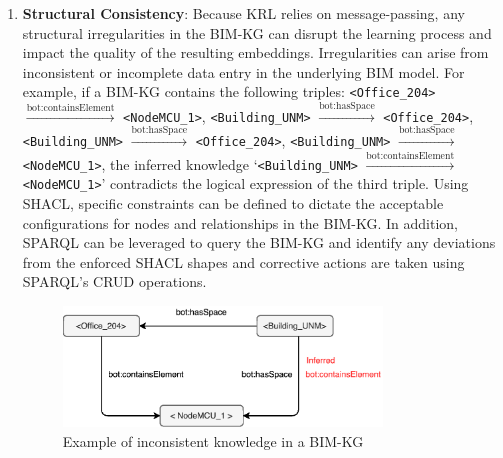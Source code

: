 \begin{enumerate}
    \item 
    \textbf{Structural Consistency}: Because \ac{KRL} relies on message-passing, any structural irregularities in the \ac{BIM-KG} can disrupt the learning process and impact the quality of the resulting embeddings. Irregularities can arise from inconsistent or incomplete data entry in the underlying \ac{BIM} model. For example, if a \ac{BIM-KG} contains the following triples: 
    \texttt{<Office\_204>} $\xrightarrow{\text{bot:containsElement}}$ \texttt{<NodeMCU\_1>}, \texttt{<Building\_UNM>} $\xrightarrow{\text{bot:hasSpace}}$ \texttt{<Office\_204>},
    \texttt{<Building\_UNM>} $\xrightarrow{\text{bot:hasSpace}}$ \texttt{<Office\_204>}, \texttt{<Building\_UNM>} $\xrightarrow{\text{bot:hasSpace}}$ \texttt{<NodeMCU\_1>}, the inferred knowledge `\texttt{<Building\_UNM>} $\xrightarrow{\text{bot:containsElement}}$ \texttt{<NodeMCU\_1>}' contradicts the logical expression of the third triple. Using \ac{SHACL}, specific constraints can be defined to dictate the acceptable configurations for nodes and relationships in the \ac{BIM-KG}. In addition, \ac{SPARQL} can be leveraged to query the \ac{BIM-KG} and identify any deviations from the enforced \ac{SHACL} shapes and corrective actions are taken using \ac{SPARQL}'s \ac{CRUD} operations.

    \begin{figure}
        \centering
        \includegraphics[width=0.8\textwidth]{figures/inconsistent-kg.eps}
        \caption{Example of inconsistent knowledge in a \ac{BIM-KG}} \label{INCONSISTENT-KG}
    \end{figure}


\end{enumerate}
